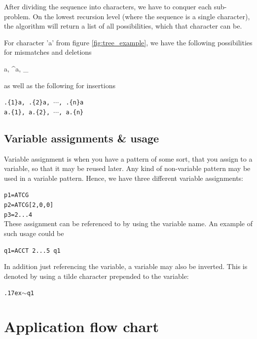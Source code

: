 \documentclass[12pt]{article}
\begin{document}
After dividing the sequence into characters, we have to conquer each sub-problem. On the lowest recursion level (where the sequence is a single character), the algorithm will return a list of all possibilities, which that character can be.

For character 'a' from figure \ref{fig:tree_example}, we have the following possibilities for mismatches and deletions

\begin{center}
	{a, \^{}a, \_}
\end{center}

as well as the following for insertions

\begin{center}
	\texttt{.\{1\}a, .\{2\}a, $\cdots$, .\{n\}a} \\
	\texttt{a.\{1\}, a.\{2\}, $\cdots$, a.\{n\}}
\end{center}


\subsection{Variable assignments \& usage}

Variable assignment is when you have a pattern of some sort, that you assign to a variable, so that it may be reused later. Any kind of non-variable pattern may be used in a variable pattern. Hence, we have three different variable assignments:

\texttt{p1=ATCG} \\
\texttt{p2=ATCG[2,0,0]} \\
\texttt{p3=2...4} \\

These assignment can be referenced to by using the variable name. An example of such usage could be

\texttt{q1=ACCT 2...5 q1}

In addition just referencing the variable, a variable may also be inverted. This is denoted by using a tilde character prepended to the variable:

\texttt{{\raise.17ex\hbox{$\scriptstyle\mathtt{\sim}$}}q1}


\section{Application flow chart}
\end{document}
